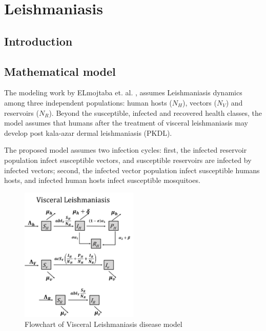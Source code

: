 \documentclass{book}
\begin{document}
\section{Leishmaniasis}
%
\subsection*{Introduction}

\subsection*{Mathematical model}
The modeling work by ELmojtaba et. al. \cite{elmojtaba2010mathematical}, assumes Leishmaniasis dynamics among three independent populations: human hosts ($N_H$), vectors ($N_V$)  and reservoirs ($N_R$).
%
Beyond the susceptible, infected and recovered health classes, the model assumes that humans after the treatment of visceral leishmaniasis may develop post kala-azar dermal leishmaniasis (PKDL).

The proposed model assumes two infection cycles: first, the infected reservoir population infect susceptible vectors, and susceptible reservoirs are infected by infected vectors; second, the infected vector population infect susceptible humans hosts, and infected human hosts infect susceptible mosquitoes.

\begin{figure}[H]
    \centering
    \includegraphics[width = 0.5\textwidth]{Flowcharts/visceralleishmaniasis.png}
    \caption{Flowchart of Visceral Leishmaniasis disease model}
    \label{fig:leishmaniasis_flow}
\end{figure}
\end{document}
